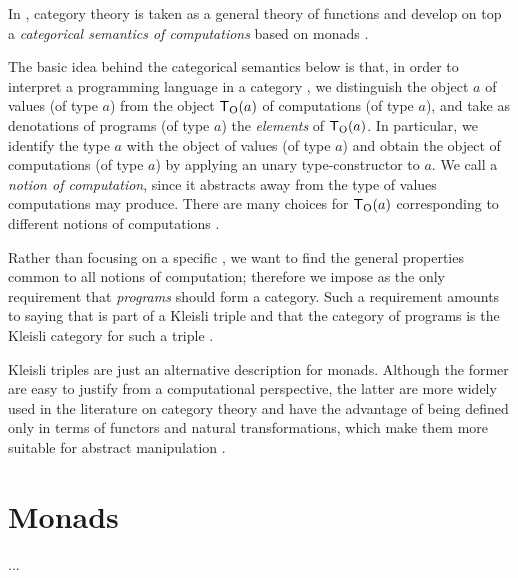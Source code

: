 
In \parencite{moggi-1991}, category theory is taken as a general
theory of functions and develop on top a \emph{categorical semantics
  of computations} based on monads \parencite[56]{moggi-1991}.

The basic idea behind the categorical semantics below is that, in
order to interpret a programming language in a category , we
distinguish the object $a$ of values (of type $a$) from the object
$\mathsf{T}_{\operatorname{O}}(a)$ of computations (of type $a$), and take as denotations
of programs (of type $a$) the \emph{elements} of $\mathsf{T}_{\operatorname{O}}(a)$. In
particular, we identify the type $a$ with the object of values (of
type $a$) and obtain the object of computations (of type $a$) by
applying an unary type-constructor  to $a$. We call 
a \emph{notion of computation}, since it abstracts away from the type
of values computations may produce. There are many choices for
$\mathsf{T}_{\operatorname{O}}(a)$ corresponding to different notions of computations
\parencite[57--58]{moggi-1991}.

Rather than focusing on a specific , we want to find the
general properties common to all notions of computation; therefore we
impose as the only requirement that \emph{programs} should form a
category. Such a requirement amounts to saying that  is part
of a Kleisli triple and that the category of programs is the Kleisli
category for such a triple \parencite[58]{moggi-1991}.

Kleisli triples are just an alternative description for monads.
Although the former are easy to justify from a computational
perspective, the latter are more widely used in the literature on
category theory and have the advantage of being defined only in terms
of functors and natural transformations, which make them more suitable
for abstract manipulation \parencite[60]{moggi-1991}.

\section{Monads}
\label{sec:monads}

...



